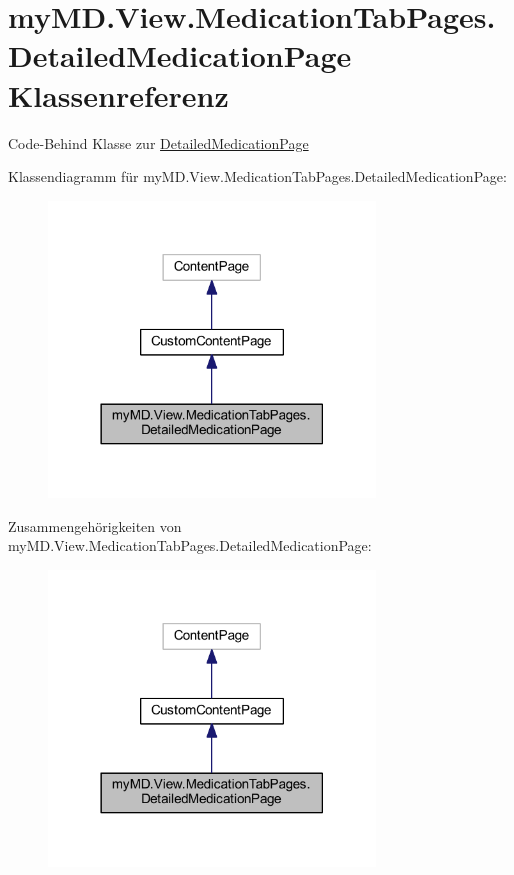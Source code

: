 \hypertarget{classmy_m_d_1_1_view_1_1_medication_tab_pages_1_1_detailed_medication_page}{}\section{my\+M\+D.\+View.\+Medication\+Tab\+Pages.\+Detailed\+Medication\+Page Klassenreferenz}
\label{classmy_m_d_1_1_view_1_1_medication_tab_pages_1_1_detailed_medication_page}


Code-\/\+Behind Klasse zur \mbox{\hyperlink{classmy_m_d_1_1_view_1_1_medication_tab_pages_1_1_detailed_medication_page}{Detailed\+Medication\+Page}}  




Klassendiagramm für my\+M\+D.\+View.\+Medication\+Tab\+Pages.\+Detailed\+Medication\+Page\+:
\nopagebreak
\begin{figure}[H]
\begin{center}
\leavevmode
\includegraphics[width=246pt]{classmy_m_d_1_1_view_1_1_medication_tab_pages_1_1_detailed_medication_page__inherit__graph}
\end{center}
\end{figure}


Zusammengehörigkeiten von my\+M\+D.\+View.\+Medication\+Tab\+Pages.\+Detailed\+Medication\+Page\+:
\nopagebreak
\begin{figure}[H]
\begin{center}
\leavevmode
\includegraphics[width=246pt]{classmy_m_d_1_1_view_1_1_medication_tab_pages_1_1_detailed_medication_page__coll__graph}
\end{center}
\end{figure}
